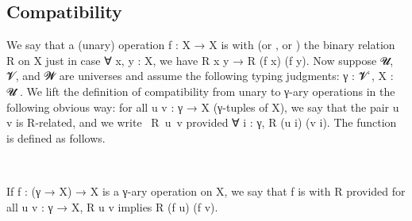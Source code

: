 \documentclass[a4paper,UKenglish,cleveref,autoref,thm-restate]{lipics-v2021}
\begin{document}
\subsection{Compatibility}\label{ssec:compatibility}
We say that a (unary) operation \ab f \as : \ab X \as → \ab X is  with (or , or ) the binary relation \ab R on \ab X just in case \as ∀ \ab x, \ab y \as : X, we have \ab R \ab x \ab y \as →  \ab R (\ab f \ab x) (\ab f \ab y).  Now suppose \ab 𝓤, \ab 𝓥, and \ab 𝓦 are universes and assume the following typing judgments: \ab γ \as : \ab 𝓥 \af ̇, \ab X \as : \ab 𝓤 \af ̇. We lift the definition of compatibility from unary to \ab γ-ary operations in the following obvious way: for all \ab u \ab v \as : \ab γ \as → \ab X (\ab γ-tuples of \ab X), we say that the pair \ab u \ab v is \ab R-related, and we write ~\ab R~\ab u~\ab v provided \as ∀ \ab i \as : \ab γ, \ab R (\ab u \ab i) (\ab v \ab i). The function  is defined as follows.
\ccpad
\begin{code}%
\>[1]\AgdaSpace{}%
\AgdaSymbol{:}\AgdaSpace{}%
\AgdaSpace{}%
\AgdaSpace{}%
\AgdaSpace{}%
\AgdaSpace{}%
\AgdaSymbol{(}\AgdaSpace{}%
\AgdaSpace{}%
\AgdaSymbol{)}\AgdaSpace{}%
\AgdaSpace{}%
\AgdaSymbol{(}\AgdaSpace{}%
\AgdaSpace{}%
\AgdaSymbol{)}\AgdaSpace{}%
\AgdaSpace{}%
\AgdaSpace{}%
\AgdaSpace{}%
\AgdaSpace{}%
\<%
\\
%
\>[1]\AgdaSpace{}%
\AgdaSpace{}%
\AgdaSpace{}%
\AgdaSpace{}%
\AgdaSymbol{=}\AgdaSpace{}%
\AgdaSpace{}%
\AgdaSpace{}%
\AgdaSpace{}%
\AgdaSpace{}%
\AgdaSymbol{(}\AgdaSpace{}%
\AgdaSymbol{)}\AgdaSpace{}%
\AgdaSymbol{(}\AgdaSpace{}%
\AgdaSymbol{)}\<%
\end{code}
\ccpad
If \ab f \as : (\ab γ \as → \ab X) \as → \ab X is a \ab γ-ary operation on \ab X, we say that \ab f is  with \ab R provided for all \ab u \ab v : \ab γ \as → \ab X,  \ab R \ab u \ab v implies \ab R (\ab f \ab u) (\ab f \ab v).
\ccpad
\end{document}
